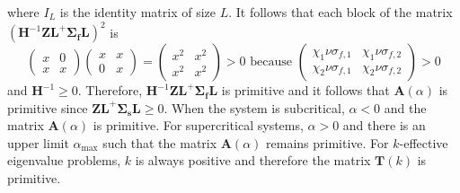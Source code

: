 where $I_{L}$ is the identity matrix of size $L$. It follows that each block of the matrix $(\mathbf{H}^{-1}\mathbf{Z} \mathbf{L}^{+}  \mathbf{\Sigma_{f}} \mathbf{L})^{2}$ is
\begin{equation*}
	\begin{pmatrix}
		x & 0 \\ x & x
	\end{pmatrix}
\begin{pmatrix}
		x & x \\ 0 & x
	\end{pmatrix} =
\begin{pmatrix}
		x^2 & x^2 \\ x^2 & x^{2}
	\end{pmatrix} > 0 \text{ because }
\begin{pmatrix}
	\chi_{1} \nu\sigma_{f,1} & \chi_{1}\nu\sigma_{f,2} \\ \chi_{2}\nu\sigma_{f,1} & \chi_{2}\nu\sigma_{f,2}
	\end{pmatrix} > 0
\end{equation*}
and $\mathbf{H}^{-1} \geq 0$. Therefore, $\mathbf{H}^{-1}\mathbf{Z} \mathbf{L}^{+}  \mathbf{\Sigma_{f}} \mathbf{L}$ is primitive and it follows that $\mathbf{A}(\alpha)$ is primitive since $\mathbf{Z} \mathbf{L}^{+}  \mathbf{\Sigma_{s}} \mathbf{L} \geq 0$. When the system is subcritical, $\alpha < 0$ and the matrix $\mathbf{A}(\alpha)$ is primitive. For supercritical systems, $\alpha > 0$ and there is an upper limit $\alpha_{\text{max}}$ such that the matrix $\mathbf{A}(\alpha)$ remains primitive. For $k$-effective eigenvalue problems, $k$ is always positive and therefore the matrix $\mathbf{T}(k)$ is primitive.

